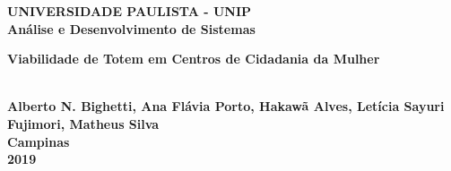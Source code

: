 \thispagestyle{empty}
\begin{center}
	\normalsize{\textbf{UNIVERSIDADE PAULISTA - UNIP}}\\[0.3pc]
	\normalsize{\textbf{Análise e Desenvolvimento de Sistemas}}\\[7pc]
	
	\parbox{10cm}{\begin{center}\normalsize{\textbf{Viabilidade de Totem em Centros de Cidadania da Mulher}}\end{center}}\\

	\vspace{160pt}
	\normalsize{\textbf{Alberto N. Bighetti, Ana Flávia Porto, Hakawã Alves, Letícia Sayuri Fujimori, Matheus Silva}}\\[1pc]
	\vfill
	\normalsize{\textbf{Campinas}}\\[1pc]
	\normalsize{\textbf{2019}}
\end{center}
\newpage 